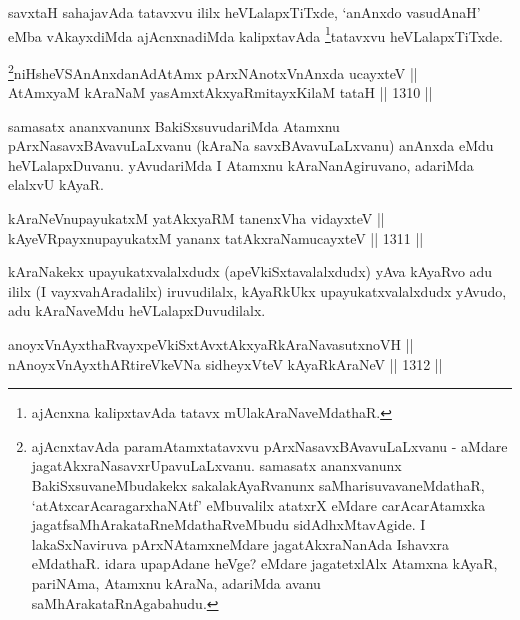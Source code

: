 \begin{artha}
savxtaH sahajavAda tatavxvu ililx heVLalapxTiTxde, `anAnxdo vasudAnaH' eMba vAkayxdiMda ajAcnxnadiMda kalipxtavAda \footnote{ajAcnxna kalipxtavAda tatavx mUlakAraNaveMdathaR.}tatavxvu heVLalapxTiTxde.
\end{artha}



\begin{shl}
\footnote{ajAcnxtavAda paramAtamxtatavxvu pArxNasavxBAvavuLaLxvanu - aMdare jagatAkxraNasavxrUpavuLaLxvanu. samasatx ananxvanunx BakiSxsuvaneMbudakekx sakalakAyaRvanunx saMharisuvavaneMdathaR, `atAtxcarAcara\-garxhaNAtf' eMbuvalilx atatxrX eMdare carAcarAtamxka jagatfsaMhArakataRneMdathaRveMbudu sidAdhxMtavAgide. I lakaSxNaviruva pArxNAtamxneMdare jagatAkxraNanAda Ishavxra eMdathaR. idara upapAdane heVge? eMdare jagatetxlAlx Atamxna kAyaR, pariNAma, Atamxnu kAraNa, adariMda avanu saMhArakataRnAgabahudu.}niHsheVSAnAnxdanAdAtAmx pArxNAnotxV\s nAnxda ucayxteV || \\
AtAmx\s yaM kAraNaM yasAmxtAkxyaRmitayxKilaM tataH \hfill || 1310 ||  
\end{shl}

\begin{artha}
samasatx ananxvanunx BakiSxsuvudariMda Atamxnu pArxNasavxBAvavuLaLxvanu (kAraNa savxBAvavuLaLxvanu) anAnxda eMdu heVLalapxDuvanu. yAvudariMda I Atamxnu kAraNanAgiruvano, adariMda elalxvU kAyaR.
\end{artha}

\begin{shl}
kAraNeV\s nupayukatxM yatAkxyaRM tanenxVha vidayxteV || \\
kAyeVR\s payxnupayukatxM yananx tatAkxraNamucayxteV \hfill || 1311 ||  
\end{shl}

\begin{artha}
kAraNakekx upayukatxvalalxdudx (apeVkiSxtavalalxdudx) yAva kAyaRvo adu ililx (I vayxvahAradalilx) iruvudilalx, kAyaRkUkx upayukatxvalalxdudx yAvudo, adu kAraNaveMdu heVLalapxDuvudilalx.
\end{artha}


\begin{shl}
anoyxVnAyxthaRvayxpeVkiSxtAvxtAkxyaRkAraNavasutxnoVH || \\
nAnoyxVnAyxthARtireVkeVNa sidheyxVteV kAyaRkAraNeV \hfill || 1312 ||  
\end{shl}

